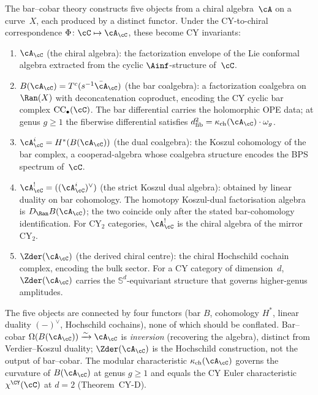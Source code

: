 \begin{remark}
\label{rem:v3-five-object-chain}
The bar--cobar theory constructs five objects from a chiral algebra~$\cA$
on a curve~$X$, each produced by a distinct functor. Under the CY-to-chiral correspondence
$\Phi \colon \cC \mapsto \cA_\cC$, these become CY invariants:
\begin{enumerate}[label=(\roman*)]
 \item $\cA_\cC$ (the chiral algebra): the factorization
 envelope of the Lie conformal algebra extracted from the
 cyclic $\Ainf$-structure of~$\cC$.
 \item $B(\cA_\cC) = T^c(s^{-1}\bar{\cA}_\cC)$ (the bar
 coalgebra): a factorization coalgebra on $\Ran(X)$ with
 deconcatenation coproduct, encoding the CY cyclic bar
 complex $\mathrm{CC}_\bullet(\cC)$. The bar differential
 carries the holomorphic OPE data; at genus $g \geq 1$ the
 fiberwise differential satisfies
 $d_{\mathrm{fib}}^2 = \kappa_{\mathrm{ch}}(\cA_\cC) \cdot
 \omega_g$.
 \item $\cA_\cC^i = H^*(B(\cA_\cC))$ (the dual coalgebra):
 the Koszul cohomology of the bar complex, a cooperad-algebra
 whose coalgebra structure encodes the BPS spectrum of~$\cC$.
 \item $\cA_\cC^! = ((\cA_\cC^i)^\vee)$ (the strict Koszul dual
 algebra): obtained by linear duality on bar cohomology. The
 homotopy Koszul-dual factorisation algebra is
 $D_{\Ran}B(\cA_\cC)$; the two coincide only after the stated
 bar-cohomology identification. For CY$_2$ categories,
 $\cA_\cC^!$ is the chiral algebra of the mirror CY$_2$.
 \item $\Zder(\cA_\cC)$ (the derived chiral centre): the
 chiral Hochschild cochain complex, encoding the bulk sector.
 For a CY category of dimension~$d$, $\Zder(\cA_\cC)$ carries
 the $\mathbb{S}^d$-equivariant structure that governs
 higher-genus amplitudes.
\end{enumerate}
The five objects are connected by four functors (bar $B$,
cohomology $H^*$, linear duality $(-)^\vee$, Hochschild
cochains), none of which should be conflated. Bar--cobar
$\Omega(B(\cA_\cC)) \xrightarrow{\sim} \cA_\cC$ is
\emph{inversion} (recovering the algebra), distinct from
Verdier--Koszul duality;
$\Zder(\cA_\cC)$ is the Hochschild construction, not the
output of bar--cobar. The modular characteristic
$\kappa_{\mathrm{ch}}(\cA_\cC)$ governs the curvature of
$B(\cA_\cC)$ at genus $g \geq 1$ and equals the CY Euler
characteristic $\chi^{\CY}(\cC)$ at $d = 2$ (Theorem~CY-D).
\end{remark}

